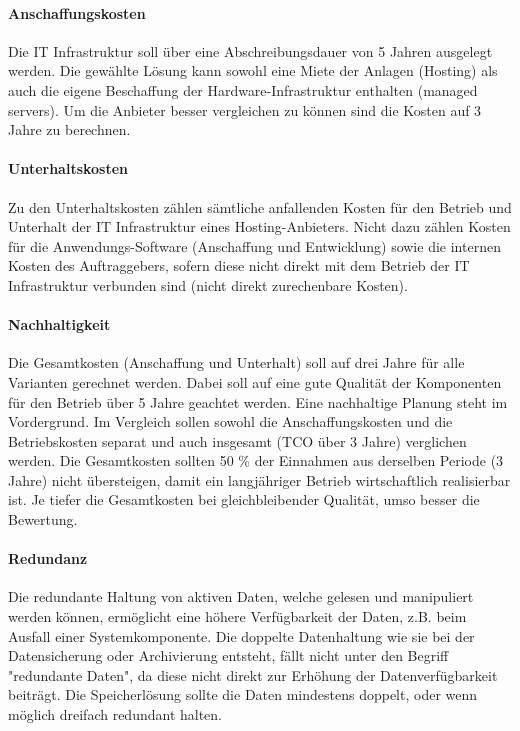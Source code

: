 \setcounter{paragraph}{0}
\renewcommand\theparagraph{Soll-1-\arabic{paragraph}}

\paragraph{Anschaffungskosten}\label{Soll-1-1}
Die IT Infrastruktur soll über eine Abschreibungsdauer von 5 Jahren ausgelegt werden. Die gewählte Lösung kann sowohl eine Miete der Anlagen (Hosting) als auch die eigene Beschaffung der Hardware-Infrastruktur enthalten (managed servers). Um die Anbieter besser vergleichen zu können sind die Kosten auf 3 Jahre zu berechnen. 

\paragraph{Unterhaltskosten}\label{Soll-1-2}
Zu den Unterhaltskosten zählen sämtliche anfallenden Kosten für den Betrieb und Unterhalt der IT Infrastruktur eines Hosting-Anbieters. Nicht dazu zählen Kosten für die Anwendungs-Software (Anschaffung und Entwicklung) sowie die internen Kosten des Auftraggebers, sofern diese nicht direkt mit dem Betrieb der IT Infrastruktur verbunden sind (nicht direkt zurechenbare Kosten).

\paragraph{Nachhaltigkeit}\label{Soll-1-3}
Die Gesamtkosten (Anschaffung und Unterhalt) soll auf drei Jahre für alle Varianten gerechnet werden. Dabei soll auf eine gute Qualität der Komponenten für den Betrieb über 5 Jahre geachtet werden. Eine nachhaltige Planung steht im Vordergrund. Im Vergleich sollen sowohl die Anschaffungskosten und die Betriebskosten separat und auch insgesamt (TCO über 3 Jahre) verglichen werden.
Die Gesamtkosten sollten 50 \% der Einnahmen aus derselben Periode (3 Jahre) nicht übersteigen, damit ein langjähriger Betrieb wirtschaftlich realisierbar ist. Je tiefer die Gesamtkosten bei gleichbleibender Qualität, umso besser die Bewertung.

\setcounter{paragraph}{0}
\renewcommand\theparagraph{Soll-2-\arabic{paragraph}}

\paragraph{Redundanz}\label{Soll-2-1}
Die redundante Haltung von aktiven Daten, welche gelesen und manipuliert werden können, ermöglicht eine höhere Verfügbarkeit der Daten, z.B. beim Ausfall einer Systemkomponente. Die doppelte Datenhaltung wie sie bei der Datensicherung oder Archivierung entsteht, fällt nicht unter den Begriff "redundante Daten", da diese nicht direkt zur Erhöhung der Datenverfügbarkeit beiträgt. Die Speicherlösung sollte die Daten mindestens doppelt, oder wenn möglich dreifach redundant halten. 


